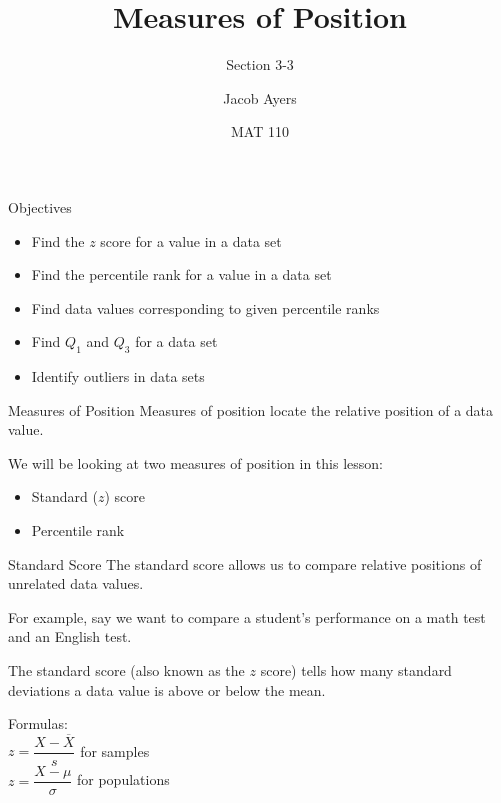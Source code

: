 \documentclass[t, aspectratio=169]{beamer}
\title[3-3]{Measures of Position}
\subtitle{Section 3-3}
\author{Jacob Ayers}
\institute{Lesson \#7}
\date{MAT 110}
\newcommand{\?}{\stackrel{?}{=}}
\begin{document}
	
	\begin{frame}
		\titlepage
	\end{frame}
	
	\begin{frame}{Objectives}
		\begin{itemize}
			\item Find the $z$ score for a value in a data set
			\item Find the percentile rank for a value in a data set
			\item Find data values corresponding to given percentile ranks
			\item Find $Q_1$ and $Q_3$ for a data set
			\item Identify outliers in data sets
		\end{itemize}
	\end{frame}

	\begin{frame}{Measures of Position}
		Measures of position locate the relative position of a data value. \pause
		
		We will be looking at two measures of position in this lesson: \begin{itemize}
			\item Standard ($z$) score
			\item Percentile rank
		\end{itemize}
	\end{frame}

	\begin{frame}{Standard Score}
		The standard score allows us to compare relative positions of unrelated data values. \pause
		
		For example, say we want to compare a student's performance on a math test and an English test. \pause
		
		The standard score (also known as the $z$ score) tells how many standard deviations a data value is above or below the mean. \pause
		
		Formulas: \\
		$z = \dfrac{X - \overline{X}}{s}$ for samples \\
		$z = \dfrac{X - \mu}{\sigma}$ for populations
	\end{frame}
\end{document}
